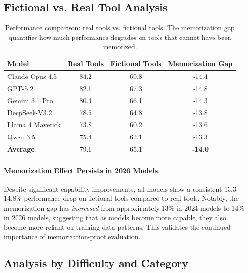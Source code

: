\documentclass{article}
\begin{document}
\subsection{Fictional vs. Real Tool Analysis}

\begin{table}[h]
\centering
\caption{Performance comparison: real tools vs. fictional tools. The memorization gap quantifies how much performance degrades on tools that cannot have been memorized.}
\label{tab:fictional-analysis}
\begin{tabular}{lccc}
\toprule
\textbf{Model} & \textbf{Real Tools} & \textbf{Fictional Tools} & \textbf{Memorization Gap} \\
\midrule
Claude Opus 4.5 & 84.2 & 69.8 & -14.4 \\
GPT-5.2 & 82.1 & 67.3 & -14.8 \\
Gemini 3.1 Pro & 80.4 & 66.1 & -14.3 \\
DeepSeek-V3.2 & 78.6 & 64.8 & -13.8 \\
Llama 4 Maverick & 73.8 & 60.2 & -13.6 \\
Qwen 3.5 & 75.4 & 62.1 & -13.3 \\
\midrule
\textbf{Average} & 79.1 & 65.1 & \textbf{-14.0} \\
\bottomrule
\end{tabular}
\end{table}

\paragraph{Memorization Effect Persists in 2026 Models.} Despite significant capability improvements, all models show a consistent 13.3-14.8\% performance drop on fictional tools compared to real tools. Notably, the memorization gap has \emph{increased} from approximately 13\% in 2024 models to 14\% in 2026 models, suggesting that as models become more capable, they also become more reliant on training data patterns. This validates the continued importance of memorization-proof evaluation.

\subsection{Analysis by Difficulty and Category}
\end{document}
